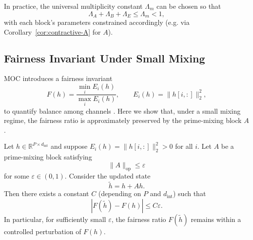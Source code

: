 \documentclass[11pt]{article}
\begin{document}
In practice, the universal multiplicity constant \(\Lambda_m\) can be chosen
so that
\[
  \Lambda_A + \Lambda_B + \Lambda_E \le \Lambda_m < 1,
\]
with each block's parameters constrained accordingly (e.g. via
Corollary~\ref{cor:contractive-A} for \(A\)).

\subsection{Fairness Invariant Under Small Mixing}

MOC introduces a fairness invariant
\[
  F(h) = \frac{\min_i E_i(h)}{\max_i E_i(h)},
  \qquad
  E_i(h) = \|h[i,:]\|_2^2,
\]
to quantify balance among channels \cite{MOC}. Here we show that, under a
small mixing regime, the fairness ratio is approximately preserved by the
prime-mixing block \(A\).

\begin{lemma}
\label{lem:fairness-preservation}
Let \(h \in \mathbb{R}^{P \times d_{\text{int}}}\) and suppose
\(E_i(h) = \|h[i,:]\|_2^2 > 0\) for all \(i\). Let \(A\) be a prime-mixing
block satisfying
\[
  \|A\|_{\mathrm{op}} \le \varepsilon
\]
for some \(\varepsilon \in (0,1)\). Consider the updated state
\[
  \tilde h = h + A h.
\]
Then there exists a constant \(C\) (depending on \(P\) and
\(d_{\text{int}}\)) such that
\[
  |F(\tilde h) - F(h)|
  \le
  C \varepsilon.
\]
In particular, for sufficiently small \(\varepsilon\), the fairness ratio
\(F(\tilde h)\) remains within a controlled perturbation of \(F(h)\).
\end{lemma}
\end{document}
